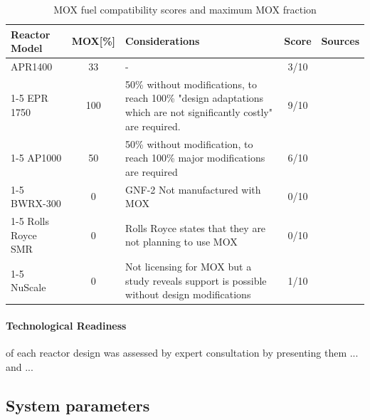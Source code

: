 \begin{table}[!hb]
    \centering
    \begin{tabularx}{\textwidth}{l c X c c}
        \toprule
        \textbf{Reactor Model} & \textbf{MOX[\%]} & \textbf{Considerations} & \textbf{Score} & Sources \\
        \midrule
        APR1400         & 33 & - & 3/10 & \cite{iaea2025aris} \\
        \cmidrule(lr){1-5}
        EPR 1750        & 100 & 50\% without modifications, to reach 100\% "design adaptations which are not significantly costly" are required.  & 9/10 & \cite{iaea2025aris, osti_22257897} \\
        \cmidrule(lr){1-5}
        AP1000          & 50 & 50\% without modification, to reach 100\% major modifications are required & 6/10 & \cite{iaea2025aris, FETTERMAN2009324} \\
        \cmidrule(lr){1-5}
        BWRX-300        & 0 & GNF-2 Not manufactured with MOX & 0/10 & \cite{CNSC_BWRX300_Fuel_Design} \\
        \cmidrule(lr){1-5}
        Rolls Royce SMR & 0 & Rolls Royce states that they are not planning to use MOX & 0/10 & \cite{RollsRoyce_SMR_GDA_Consultation} \\
        \cmidrule(lr){1-5}
        NuScale         & 0 & Not licensing for MOX but a study reveals support is possible without design modifications & 1/10 & \cite{NRC_ML17007A001, NuScale_MOX_2016} \\
        \bottomrule
    \end{tabularx}
    \caption{MOX fuel compatibility scores and maximum MOX fraction}
    \label{tab:mox-compatibility}
\end{table}

\paragraph{Technological Readiness} of each reactor design was assessed by expert consultation by presenting them ... and ...

\subsection{System parameters}
